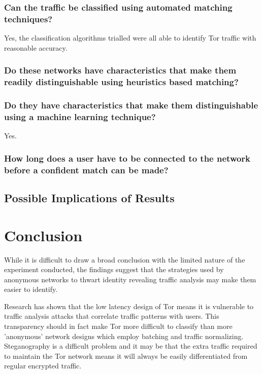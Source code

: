 \documentclass{ecuthesis}
\begin{document}
\subsection{Can the traffic be classified using automated matching techniques?}

Yes, the classification algorithms trialled were all able to identify Tor traffic
with reasonable accuracy.

\subsection{Do these networks have characteristics that make them readily
distinguishable using heuristics based matching?}

\subsection{Do they have characteristics that make them distinguishable using a
machine learning technique?}

Yes.

\subsection{How long does a user have to be connected to the network before a
confident match can be made?}


\section{Possible Implications of Results}

\chapter{Conclusion}

While it is difficult to draw a broad conclusion with the limited nature of the
experiment conducted, the findings suggest that the strategies used by anonymous
networks to thwart identity revealing traffic analysis may make them easier to
identify.

Research has shown that the low latency design of Tor means it is vulnerable to
traffic analysis attacks that correlate traffic patterns with users. This
transparency should in fact make Tor more difficult to classify than more
'anonymous' network designs which employ batching and traffic normalizing.
Steganography is a difficult problem and it may be that the extra traffic
required to maintain the Tor network means it will always be easily
differentiated from regular encrypted traffic.
\end{document}
